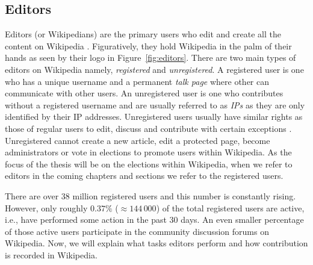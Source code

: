 \subsection{Editors}
Editors (or Wikipedians) are the primary users who edit and create all the content on Wikipedia \cite{wiki:editors}. Figuratively, they hold Wikipedia in the palm of their hands as seen by their logo in Figure~\ref{fig:editors}. There are two main types of editors on Wikipedia namely, \textit{registered} and \textit{unregistered}. A registered user is one who has a unique username and a permanent \textit{talk page} where other can communicate with other users. An unregistered user is one who contributes without a registered username and are usually referred to as \textit{IPs} as they are only identified by their IP addresses. Unregistered users usually have similar rights as those of regular users to edit, discuss and contribute with certain exceptions 
\cite{wiki:unregistered-users}. Unregistered cannot create a new article, edit a protected page, become administrators or vote in elections to promote users within Wikipedia. As the focus of the thesis will be on the elections within Wikipedia, when we refer to editors in the coming chapters and sections we refer to the registered users.

There are over 38 million registered users and this number is constantly rising. However, only roughly $0.37\%$ ($\approx 144\,000$) of the total registered users are active, i.e., have performed some action in the past 30 days. An even smaller percentage of those active users participate in the community discussion forums on Wikipedia. Now, we will explain what tasks editors perform and how contribution is recorded in Wikipedia.

